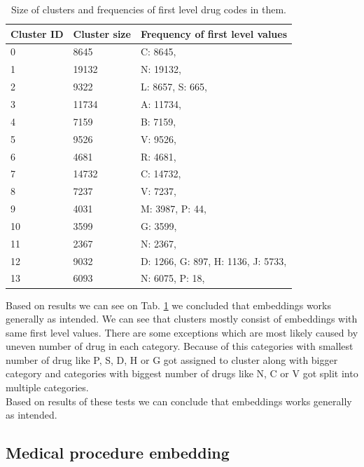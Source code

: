 \begin{table}[!h]
	\centering
	\begin{tabular}{|p{}|p{}|p{}|}
		\hline
		Cluster ID & Cluster size & Frequency of first level values \\ \hline
		0 & 8645 & C: 8645, \\ \hline
		1 & 19132 & N: 19132, \\ \hline
		2 & 9322 & L: 8657, S: 665, \\ \hline
		3 & 11734 & A: 11734, \\ \hline
		4 & 7159 & B: 7159, \\ \hline
		5 & 9526 & V: 9526, \\ \hline
		6 & 4681 & R: 4681, \\ \hline
		7 & 14732 & C: 14732, \\ \hline
		8 & 7237 & V: 7237, \\ \hline
		9 & 4031 & M: 3987, P: 44, \\ \hline
		10 & 3599 & G: 3599, \\ \hline
		11 & 2367 & N: 2367, \\ \hline
		12 & 9032 & D: 1266, G: 897, H: 1136, J: 5733, \\ \hline
		13 & 6093 & N: 6075, P: 18, \\ \hline
	\end{tabular}
\caption{Size of clusters and frequencies of first level drug codes in them.}
\label{tab:drug_clusters}
\end{table}

Based on results we can see on Tab. \ref{tab:drug_clusters} we concluded that embeddings works generally as intended. We can see that clusters mostly consist of embeddings with same first level values. There are some exceptions which are most likely caused by uneven number of drug in each category. Because of this categories with smallest number of drug like P, S, D, H or G got assigned to cluster along with bigger category and categories with biggest number of drugs like N, C or V got split into multiple categories.  
\\

Based on results of these tests we can conclude that embeddings works generally as intended.

\subsection{Medical procedure embedding}

